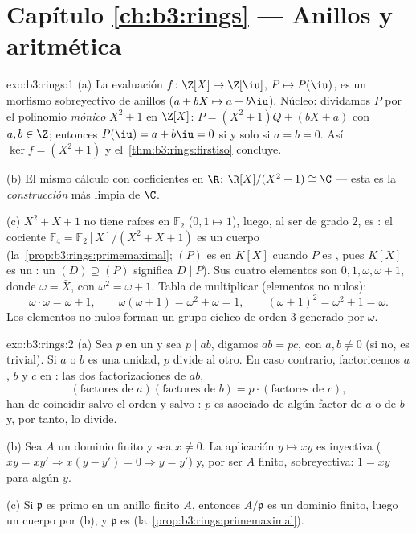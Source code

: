 \section*{Capítulo \ref{ch:b3:rings} --- Anillos y aritmética}

\begin{solution}{exo:b3:rings:1}
(a) La evaluación $f \colon \Z[X] \to \Z[\iu]$, $P \mapsto P(\iu)$, es
un morfismo sobreyectivo de anillos ($a + bX \mapsto a + b\iu$). Núcleo:
dividamos $P$ por el polinomio \emph{mónico} $X^2 + 1$ en $\Z[X]$:
$P = (X^2 +
1)Q + (bX + a)$ con $a, b \in \Z$; entonces $P(\iu) = a + b\iu = 0$ si y
solo si $a = b = 0$. Así $\ker f = (X^2+1)$ y
el~\cref{thm:b3:rings:firstiso} concluye.

(b) El mismo cálculo con coeficientes en $\R$: $\R[X]/(X^2+1)
\cong \C$ --- esta es la \emph{construcción} más limpia de $\C$.

(c) $X^2 + X + 1$ no tiene raíces en $\mathbb F_2$ ($0, 1 \mapsto 1$),
luego, al ser de grado $2$, es
: el cociente $\mathbb
F_4 = \mathbb F_2[X]/(X^2+X+1)$ es un cuerpo
(la~\cref{prop:b3:rings:primemaximal}; $(P)$ es
 en $K[X]$ cuando $P$ es
, pues $K[X]$ es un
: un 
$(D) \supseteq
(P)$ significa $D \mid P$). Sus cuatro elementos son $0, 1, \omega,
\omega + 1$, donde $\omega = \bar X$, con $\omega^2 = \omega + 1$. Tabla
de multiplicar (elementos no nulos):
\[
\omega \cdot \omega = \omega + 1, \qquad
\omega(\omega + 1) = \omega^2 + \omega = 1, \qquad
(\omega+1)^2 = \omega^2 + 1 = \omega .
\]
Los elementos no nulos forman un grupo cíclico de orden $3$ generado por
$\omega$.
\end{solution}

\begin{solution}{exo:b3:rings:2}
(a) Sea $p$  en un
 y sea $p \mid ab$, digamos $ab =
pc$, con $a, b \neq 0$ (si no, es trivial). Si $a$ o $b$ es una unidad,
$p$ divide al otro. En caso contrario, factoricemos $a$, $b$ y $c$ en
: las dos
factorizaciones de $ab$,
\[
(\text{factores de } a)(\text{factores de } b) = p \cdot
(\text{factores de } c),
\]
han de coincidir salvo el orden y salvo
: $p$ es asociado de algún
factor  de $a$ o de $b$
y, por tanto, lo divide.

(b) Sea $A$ un dominio finito y sea $x \neq 0$. La aplicación $y \mapsto
xy$ es inyectiva ($xy = xy' \Rightarrow x(y - y') = 0 \Rightarrow
y = y'$) y, por ser $A$ finito, sobreyectiva: $1 = xy$ para algún $y$.

(c) Si $\mathfrak p$ es primo en un anillo finito $A$, entonces
$A/\mathfrak p$ es un dominio finito, luego un cuerpo por (b), y
$\mathfrak p$ es 
(la~\cref{prop:b3:rings:primemaximal}).
\end{solution}

